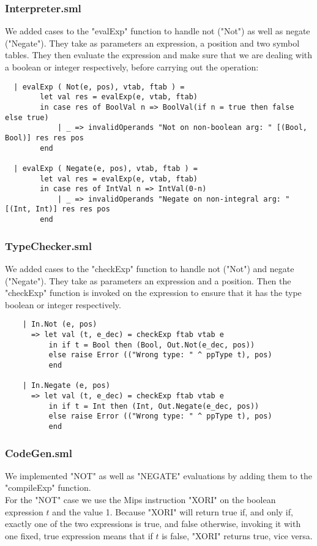 \documentclass[12pt]{article}
\begin{document}
\subsubsection{Interpreter.sml}
We added cases to the "evalExp" function to handle not ("Not") as well as negate ("Negate"). They take as parameters an expression, a position and two symbol tables. They then evaluate the expression and make sure that we are dealing with a boolean or integer respectively, before carrying out the operation:
\begin{verbatim}
  | evalExp ( Not(e, pos), vtab, ftab ) =
        let val res = evalExp(e, vtab, ftab)
        in case res of BoolVal n => BoolVal(if n = true then false else true)
            | _ => invalidOperands "Not on non-boolean arg: " [(Bool, Bool)] res res pos
        end

  | evalExp ( Negate(e, pos), vtab, ftab ) =
        let val res = evalExp(e, vtab, ftab)
        in case res of IntVal n => IntVal(0-n)
            | _ => invalidOperands "Negate on non-integral arg: " [(Int, Int)] res res pos
        end
\end{verbatim}
\subsubsection{TypeChecker.sml}
We added cases to the "checkExp" function to handle not ("Not") and negate ("Negate"). They take as parameters an expression and a position. Then the "checkExp" function is invoked on the expression to ensure that it has the type boolean or integer respectively.
\begin{verbatim}
    | In.Not (e, pos)
      => let val (t, e_dec) = checkExp ftab vtab e
          in if t = Bool then (Bool, Out.Not(e_dec, pos))
          else raise Error (("Wrong type: " ^ ppType t), pos) 
          end

    | In.Negate (e, pos)
      => let val (t, e_dec) = checkExp ftab vtab e
          in if t = Int then (Int, Out.Negate(e_dec, pos))
          else raise Error (("Wrong type: " ^ ppType t), pos) 
          end
\end{verbatim}
\subsubsection{CodeGen.sml}
We implemented "NOT" as well as "NEGATE" evaluations by adding them to the "compileExp" function. \\

For the "NOT" case we use the Mips instruction "XORI" on the boolean expression \(t\) and the value 1. Because "XORI" will return true if, and only if, exactly one of the two expressions is true, and false otherwise, invoking it with one fixed, true expression means that if \(t\) is false, "XORI" returns true, vice versa. \\
\end{document}
